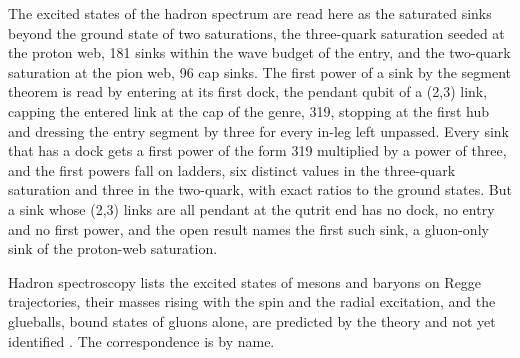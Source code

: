 The excited states of the hadron spectrum are read here as the saturated sinks beyond the ground state of two saturations, the three-quark saturation seeded at the proton web, 181 sinks within the wave budget of the entry, and the two-quark saturation at the pion web, 96 cap sinks. The first power of a sink by the segment theorem is read by entering at its first dock, the pendant qubit of a (2,3) link, capping the entered link at the cap of the genre, 319, stopping at the first hub and dressing the entry segment by three for every in-leg left unpassed. Every sink that has a dock gets a first power of the form 319 multiplied by a power of three, and the first powers fall on ladders, six distinct values in the three-quark saturation and three in the two-quark, with exact ratios to the ground states. But a sink whose (2,3) links are all pendant at the qutrit end has no dock, no entry and no first power, and the open result names the first such sink, a gluon-only sink of the proton-web saturation.
\begin{chbridge}
Hadron spectroscopy lists the excited states of mesons and baryons on Regge trajectories, their masses rising with the spin and the radial excitation, and the glueballs, bound states of gluons alone, are predicted by the theory and not yet identified \cite{Chew1962,Mathieu2009}. The correspondence is by name.
\end{chbridge}
